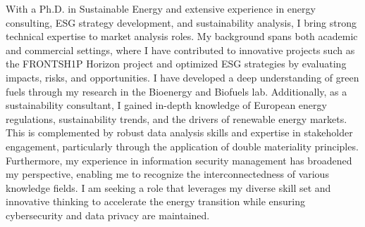 

\begin{cvparagraph}

    With a Ph.D. in Sustainable Energy and extensive experience in energy consulting, ESG strategy development, and sustainability analysis, I bring strong technical expertise to market analysis roles. My background spans both academic and commercial settings, where I have contributed to innovative projects such as the FRONTSH1P Horizon project and optimized ESG strategies by evaluating impacts, risks, and opportunities. I have developed a deep understanding of green fuels through my research in the Bioenergy and Biofuels lab. Additionally, as a sustainability consultant, I gained in-depth knowledge of European energy regulations, sustainability trends, and the drivers of renewable energy markets. This is complemented by robust data analysis skills and expertise in stakeholder engagement, particularly through the application of double materiality principles. Furthermore, my experience in information security management has broadened my perspective, enabling me to recognize the interconnectedness of various knowledge fields. I am seeking a role that leverages my diverse skill set and innovative thinking to accelerate the energy transition while ensuring cybersecurity and data privacy are maintained.
\end{cvparagraph}
